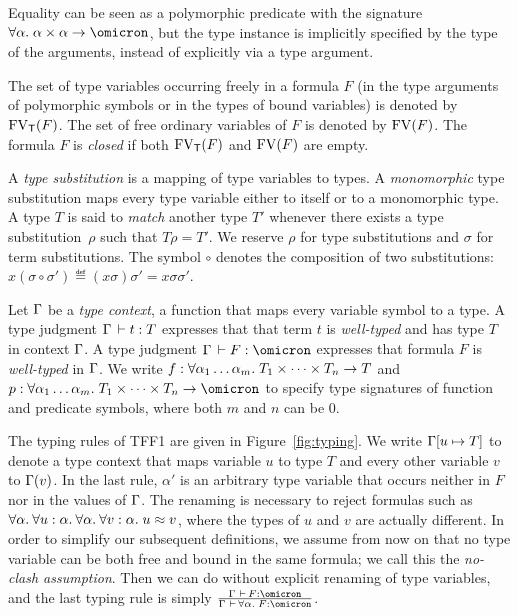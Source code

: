 Equality can be seen as a polymorphic predicate with the signature
$\forall\alpha.\; \alpha\times\alpha\to\omicron$, but the type instance is
implicitly specified by the type of the arguments, instead of explicitly via a
type argument.

The set of type variables occurring freely in a formula $F$
(in the type arguments of polymorphic symbols or
in the types of bound variables) is denoted by $\mathrm{FV}_\mathsf{T}(F)$.
The set of free ordinary variables of $F$
is denoted by $\mathrm{FV}(F)$. The formula $F$ is {\em closed\/}
if both $\mathrm{FV}_\mathsf{T}(F)$ and $\mathrm{FV}(F)$ are empty.

A {\em type substitution\/} is a mapping of type variables
to types. A {\em monomorphic\/} type substitution
maps every type variable either to itself or to a monomorphic type.
%
A type $T$ is said to {\em match\/} another type $T'$ whenever there exists a
type substitution~$\rho$ such that $T\rho = T'$. We reserve $\rho$ for type
substitutions and $\sigma$ for term substitutions.
%
The symbol $\circ$ denotes the composition
of two substitutions:\ 
$x(\sigma \circ \sigma') \eqdef (x\sigma)\sigma' = x\sigma\sigma'$.

Let $\mathrm{\Gamma}$ be a {\em type context}, a function that maps
every variable symbol to a type.
A type judgment $\mathrm{\Gamma} \,\vdash t \mathrel{:} T$ expresses that that term $t$
is {\em well-typed\/} and has type $T$ in context $\mathrm{\Gamma}$.
A type judgment $\GAM \,\vdash F \ty \omicron$ expresses that formula $F$
is {\em well-typed\/} in $\mathrm{\Gamma}$.
We write $f \mathrel{:} \forall \alpha_1\dots\alpha_m .\;
T_1 \times \dots \times T_n \to T$ and
$p \ty \forall \alpha_1\dots\alpha_m .\;
T_1 \times \dots \times T_n \to \omicron$ to specify
type signatures of function and predicate symbols,
where both $m$ and $n$ can be 0.

The typing rules of TFF1 are given in Figure~\ref{fig:typing}.
We write $\mathrm{\Gamma}[u \mapsto T]$ to denote a type context that maps
variable $u$ to type $T$ and every other variable $v$ to $\mathrm{\Gamma}(v)$.
In the last rule, $\alpha'$ is an arbitrary type variable that
occurs neither in $F$ nor in the values of $\mathrm{\Gamma}$.
The renaming is necessary to reject formulas such as
$\forall\alpha.\:\forall u\mathrel{:}\alpha.\:\forall\alpha.\:\forall v\mathrel{:}\alpha.\;
u \approx v$, where the types of $u$ and $v$ are actually different.
In order to simplify our subsequent definitions, we assume from now on
that no type variable can be both free and bound in the same formula;
we call this the {\em no-clash assumption}.
Then we can do without explicit renaming of type variables,
and the last typing rule is simply
$\frac{\GAM\, \,\vdash\, F \ty \omicron}{
\GAM\, \,\vdash\, \forall \alpha .\; F \ty \omicron}$.

